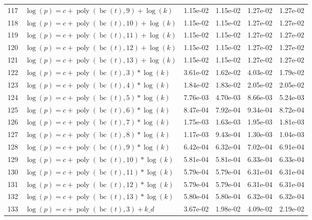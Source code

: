 \documentclass[12pt,a4paper]{article}
\DeclareMathOperator{\bc}{bc}
\DeclareMathOperator{\poly}{poly}
\begin{document}
\begin{longtable}[t]{ll>{\raggedleft\arraybackslash}p{2cm}>{\raggedleft\arraybackslash}p{2cm}>{\raggedleft\arraybackslash}p{2cm}>{\raggedleft\arraybackslash}p{2cm}}
\rowcolor{gray!6}  117 & $\log(p) = c + \poly\left( \bc(t), 9 \right) + \log(k)$ & 1.15e-02 & 1.15e-02 & 1.27e-02 & 1.27e-02\\
118 & $\log(p) = c + \poly\left( \bc(t), 10 \right) + \log(k)$ & 1.15e-02 & 1.15e-02 & 1.27e-02 & 1.27e-02\\
\rowcolor{gray!6}  119 & $\log(p) = c + \poly\left( \bc(t), 11 \right) + \log(k)$ & 1.15e-02 & 1.15e-02 & 1.27e-02 & 1.27e-02\\
120 & $\log(p) = c + \poly\left( \bc(t), 12 \right) + \log(k)$ & 1.15e-02 & 1.15e-02 & 1.27e-02 & 1.27e-02\\
\rowcolor{gray!6}  121 & $\log(p) = c + \poly\left( \bc(t), 13 \right) + \log(k)$ & 1.15e-02 & 1.15e-02 & 1.27e-02 & 1.27e-02\\
122 & $\log(p) = c + \poly\left( \bc(t), 3 \right) * \log(k)$ & 3.61e-02 & 1.62e-02 & 4.03e-02 & 1.79e-02\\
\rowcolor{gray!6}  123 & $\log(p) = c + \poly\left( \bc(t), 4 \right) * \log(k)$ & 1.84e-02 & 1.83e-02 & 2.05e-02 & 2.05e-02\\
124 & $\log(p) = c + \poly\left( \bc(t), 5 \right) * \log(k)$ & 7.76e-03 & 4.70e-03 & 8.66e-03 & 5.24e-03\\
\rowcolor{gray!6}  125 & $\log(p) = c + \poly\left( \bc(t), 6 \right) * \log(k)$ & 8.47e-04 & 7.92e-04 & 9.34e-04 & 8.72e-04\\
126 & $\log(p) = c + \poly\left( \bc(t), 7 \right) * \log(k)$ & 1.75e-03 & 1.63e-03 & 1.95e-03 & 1.81e-03\\
\rowcolor{gray!6}  127 & $\log(p) = c + \poly\left( \bc(t), 8 \right) * \log(k)$ & 1.17e-03 & 9.43e-04 & 1.30e-03 & 1.04e-03\\
128 & $\log(p) = c + \poly\left( \bc(t), 9 \right) * \log(k)$ & 6.42e-04 & 6.32e-04 & 7.02e-04 & 6.91e-04\\
\rowcolor{gray!6}  129 & $\log(p) = c + \poly\left( \bc(t), 10 \right) * \log(k)$ & 5.81e-04 & 5.81e-04 & 6.33e-04 & 6.33e-04\\
130 & $\log(p) = c + \poly\left( \bc(t), 11 \right) * \log(k)$ & 5.79e-04 & 5.79e-04 & 6.31e-04 & 6.31e-04\\
\rowcolor{gray!6}  131 & $\log(p) = c + \poly\left( \bc(t), 12 \right) * \log(k)$ & 5.79e-04 & 5.79e-04 & 6.31e-04 & 6.31e-04\\
132 & $\log(p) = c + \poly\left( \bc(t), 13 \right) * \log(k)$ & 5.80e-04 & 5.80e-04 & 6.32e-04 & 6.32e-04\\
\rowcolor{gray!6}  133 & $\log(p) = c + \poly\left( \bc(t), 3 \right) + k\_d$ & 3.67e-02 & 1.98e-02 & 4.09e-02 & 2.19e-02\\

\end{longtable}
\end{document}
